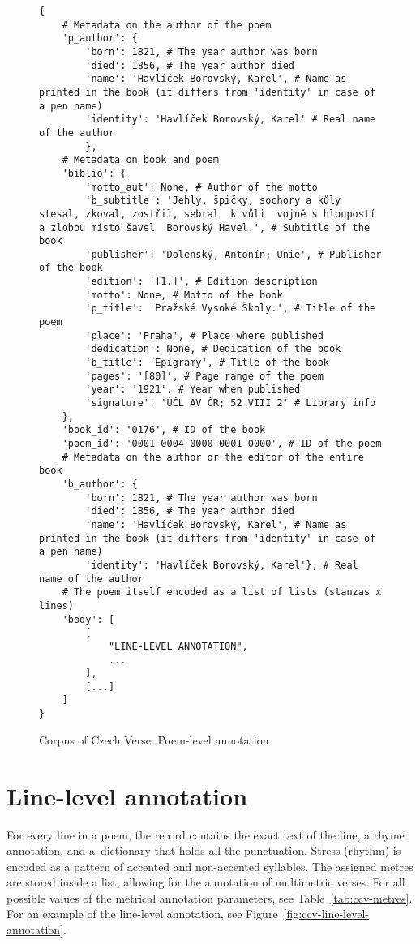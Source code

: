 \begin{figure}[htpb]
    \centering
    \begin{verbatim}
{
    # Metadata on the author of the poem
    'p_author': {
        'born': 1821, # The year author was born
        'died': 1856, # The year author died
        'name': 'Havlíček Borovský, Karel', # Name as printed in the book (it differs from 'identity' in case of a pen name)
        'identity': 'Havlíček Borovský, Karel' # Real name of the author
        },
    # Metadata on book and poem
    'biblio': {
        'motto_aut': None, # Author of the motto
        'b_subtitle': 'Jehly, špičky, sochory a kůly  stesal, zkoval, zostřil, sebral  k vůli  vojně s hloupostí a zlobou místo šavel  Borovský Havel.', # Subtitle of the book
        'publisher': 'Dolenský, Antonín; Unie', # Publisher of the book
        'edition': '[1.]', # Edition description
        'motto': None, # Motto of the book
        'p_title': 'Pražské Vysoké Školy.', # Title of the poem
        'place': 'Praha', # Place where published
        'dedication': None, # Dedication of the book
        'b_title': 'Epigramy', # Title of the book
        'pages': '[80]', # Page range of the poem
        'year': '1921', # Year when published
        'signature': 'ÚČL AV ČR; 52 VIII 2' # Library info
    },
    'book_id': '0176', # ID of the book
    'poem_id': '0001-0004-0000-0001-0000', # ID of the poem
    # Metadata on the author or the editor of the entire book
    'b_author': {
        'born': 1821, # The year author was born
        'died': 1856, # The year author died
        'name': 'Havlíček Borovský, Karel', # Name as printed in the book (it differs from 'identity' in case of a pen name)
        'identity': 'Havlíček Borovský, Karel'}, # Real name of the author
    # The poem itself encoded as a list of lists (stanzas x lines)
    'body': [
        [
            "LINE-LEVEL ANNOTATION",
            ...
        ],
        [...]
    ]
}
    \end{verbatim}
    \caption{Corpus of Czech Verse: Poem-level annotation}\label{fig:ccv-poem-level-annotation}
\end{figure}

\section{Line-level annotation}
For every line in a poem, the record contains the exact text of the line, a rhyme annotation, and a~dictionary that holds all the punctuation. Stress (rhythm) is encoded as a pattern of accented and non-accented syllables. The assigned metres are stored inside a list, allowing for the annotation of multimetric verses. For all possible values of the metrical annotation parameters, see Table~\ref{tab:ccv-metres}. For an example of the line-level annotation, see Figure~\ref{fig:ccv-line-level-annotation}.~\cite{GitCorpusCzechVerse}

